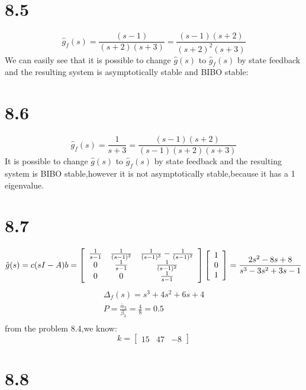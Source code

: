 \documentclass{article}
\begin{document}
\section*{8.5}

\[\hat{g}_{f}(s)=\frac{(s-1)}{(s+2)(s+3)}=\frac{(s-1)(s+2)}{(s+2)^{2}(s+3)}\]
We can easily see that it is possible to change $\hat{g}(s)$ to $\hat{g}_{f}(s)$ by state feedback and the resulting
system is asymptotically stable and BIBO stable:

\section*{8.6}
$$
\hat{g}_{f}(s)=\frac{1}{s+3}=\frac{(s-1)(s+2)}{(s-1)(s+2)(s+3)}
$$
It is possible to change $\hat{g}(s)$ to $\hat{g}_{f}(s)$ by state feedback and the resulting system is BIBO stable,however it is not asymptotically stable,because it has a 1 eigenvalue.


\section*{8.7}
\[
\hat{g}(s)=c(sI-A)b=\left[\begin{array}{ccccc}
\frac{1}{s-1} & \frac{1}{(s-1)^{2}} & \frac{1}{(s-1)^{3}}-\frac{1}{(s-1)^{2}} \\
0 & \frac{1}{s-1} & \frac{1}{(s-1)^{2}} \\
0 & 0 & \frac{1}{s-1}
\end{array}\right]\left[\begin{array}{l}
1 \\
0 \\
1
\end{array}\right]=\frac{2 s^{2}-8 s+8}{s^{3}-3 s^{2}+3 s-1} \\
\]
\[
\begin{split}
\Delta_{f}(s)=s^{3}+4 s^{2}+6 s+4 \\
P=\frac{\overline{\alpha}_{3}}{\beta_{3}}=\frac{4}{8}=0.5 \\
\end{split}
\]
from the problem 8.4,we know:
\[
k=\left[\begin{array}{ccc}
15 & 47 & -8
\end{array}\right]
\]


\section*{8.8}
\end{document}
